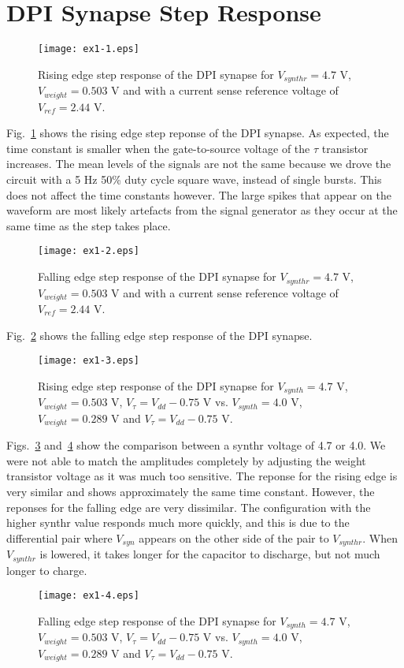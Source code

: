 

\newcommand{\reffig}[1]{Fig.~\ref{#1}}



\newpage
\section{DPI Synapse Step Response}
\begin{figure}[!htb]
    \center
    \texttt{[image: ex1-1.eps]}
    \caption{Rising edge step response of the DPI synapse for \(V_{synthr}=4.7\) V, \(V_{weight} = 0.503\) V and with a current sense reference voltage of \(V_{ref} = 2.44\) V.}
    \label{fig:ex1-1}
\end{figure}
Fig.~\ref{fig:ex1-1} shows the rising edge step reponse of the DPI synapse. As expected, the time constant is smaller when the gate-to-source voltage of the \(\tau\) transistor
increases. The mean levels of the signals are not the same because we drove the circuit with a 5 Hz 50\% duty cycle square wave, instead of single bursts. This does not affect the
time constants however. The large spikes that appear on the waveform are most likely artefacts from the signal generator as they occur at the same time as the step takes place.
\begin{figure}[!htb]
    \center
    \texttt{[image: ex1-2.eps]}
    \caption{Falling edge step response of the DPI synapse for \(V_{synthr}=4.7\) V, \(V_{weight} = 0.503\) V and with a current sense reference voltage of \(V_{ref} = 2.44\) V.}
    \label{fig:ex1-2}
\end{figure}

Fig.~\ref{fig:ex1-2} shows the falling edge step response of the DPI synapse.
\begin{figure}[!htb]
    \center
    \texttt{[image: ex1-3.eps]}
    \caption{Rising edge step response of the DPI synapse for \(V_{synth}=4.7\) V, \(V_{weight} = 0.503\) V, \(V_\tau = V_{dd}-0.75\) V vs. \(V_{synth} = 4.0\) V, \(V_{weight} = 0.289\) V and \(V_\tau = V_{dd} - 0.75\) V. }
    \label{fig:ex1-3}
\end{figure}
Figs.~\ref{fig:ex1-3} and~\ref{fig:ex1-4} show the comparison between a synthr voltage of 4.7 or 4.0. We were not able to match the amplitudes completely by adjusting the weight transistor voltage as it was much too sensitive.
The reponse for the rising edge is very similar and shows approximately the same time constant. However, the reponses for the falling edge are very dissimilar.
The configuration with the higher synthr value responds much more quickly, and this is due to the differential pair where \(V_{syn}\) appears on the other side of the pair to \(V_{synthr}\). 
When \(V_{synthr}\) is lowered, it takes longer for the capacitor to discharge, but not much longer to charge.
\begin{figure}[!htb]
    \center
    \texttt{[image: ex1-4.eps]}
    \caption{Falling edge step response of the DPI synapse for \(V_{synth}=4.7\) V, \(V_{weight} = 0.503\) V, \(V_\tau = V_{dd}-0.75\) V vs. \(V_{synth} = 4.0\) V, \(V_{weight} = 0.289\) V and \(V_\tau = V_{dd} - 0.75\) V. }
    \label{fig:ex1-4}
\end{figure}

